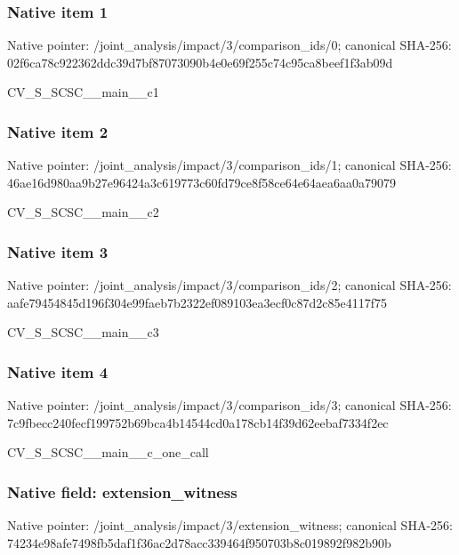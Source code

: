 \documentclass[10pt,a4paper]{article}
\begin{document}
\subsubsection{Native item 1}


Native pointer: /joint\_analysis/impact/3\allowbreak{}/comparison\_ids/0; canonical SHA-256: 02f6ca78c922362ddc39d7bf\allowbreak{}87073090b4e0e69f255c74c9\allowbreak{}5ca8beef1f3ab09d


CV\_S\_SCSC\_\_main\_\_c1


\subsubsection{Native item 2}


Native pointer: /joint\_analysis/impact/3\allowbreak{}/comparison\_ids/1; canonical SHA-256: 46ae16d980aa9b27e96424a3\allowbreak{}c619773c60fd79ce8f58ce64\allowbreak{}e64aea6aa0a79079


CV\_S\_SCSC\_\_main\_\_c2


\subsubsection{Native item 3}


Native pointer: /joint\_analysis/impact/3\allowbreak{}/comparison\_ids/2; canonical SHA-256: aafe79454845d196f304e99f\allowbreak{}aeb7b2322ef089103ea3ecf0\allowbreak{}c87d2c85e4117f75


CV\_S\_SCSC\_\_main\_\_c3


\subsubsection{Native item 4}


Native pointer: /joint\_analysis/impact/3\allowbreak{}/comparison\_ids/3; canonical SHA-256: 7c9fbecc240fecf199752b69\allowbreak{}bca4b14544cd0a178cb14f39\allowbreak{}d62eebaf7334f2ec


CV\_S\_SCSC\_\_main\_\_c\_one\_call


\subsubsection{Native field: extension\_witness}


Native pointer: /joint\_analysis/impact/3\allowbreak{}/extension\_witness; canonical SHA-256: 74234e98afe7498fb5daf1f3\allowbreak{}6ac2d78acc339464f950703b\allowbreak{}8c019892f982b90b
\end{document}
